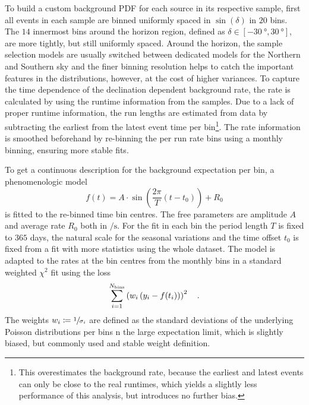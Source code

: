 To build a custom background PDF for each source in its respective sample, first all events in each sample are binned uniformly spaced in $\sin(\delta)$ in $\num{20}$ bins.
The $\num{14}$ innermost bins around the horizon region, defined as $\delta\in[\SI{-30}{\degree}, \SI{30}{\degree}]$, are more tightly, but still uniformly spaced.
Around the horizon, the sample selection models are usually switched between dedicated models for the Northern and Southern sky and the finer binning resolution helps to catch the important features in the distributions, however, at the cost of higher variances.
To capture the time dependence of the declination dependent background rate, the rate is calculated by using the runtime information from the samples.
Due to a lack of proper runtime information, the run lengths are estimated from data by subtracting the earliest from the latest event time per bin\footnote{This overestimates the background rate, because the earliest and latest events can only be close to the real runtimes, which yields a slightly less performance of this analysis, but introduces no further bias.}.
The rate information is smoothed beforehand by re-binning the per run rate bins using a monthly binning, ensuring more stable fits.

To get a continuous description for the background expectation per bin, a phenomenologic model
\begin{equation}
  \label{equ:rate_model}
  f(t)
  = A\cdot
    \sin\left(\frac{2\pi}{T}\left(t - t_0\right)\right) + R_0
\end{equation}
is fitted to the re-binned time bin centres.
The free parameters are amplitude $A$ and average rate $R_0$ both in $\si{\per\s}$.
For the fit in each bin the period length $T$ is fixed to $365$ days, the natural scale for the seasonal variations and the time offset $t_0$ is fixed from a fit with more statistics using the whole dataset.
The model is adapted to the rates at the bin centres from the monthly bins in a standard weighted $\chi^2$ fit using the loss
\begin{equation}
  \sum_{i=1}^{N_\text{bins}} \left(w_i\left(y_i - f(t_i)\right)\right)^2
  \quad\text{.}
\end{equation}
The weights $w_i\coloneqq\sfrac{1}{\sigma_i}$ are defined as the standard deviations of the underlying Poisson distributions per bins n the large expectation limit, which is slightly biased, but commonly used and stable weight definition.

